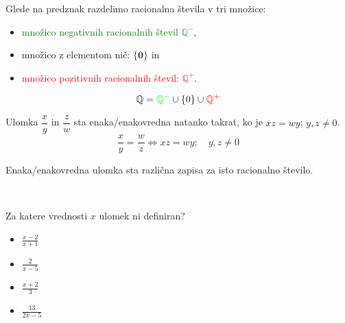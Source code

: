                     
            

            
                Glede na predznak razdelimo racionalna števila v tri množice:
                \begin{itemize}
                    \item \textcolor{green}{množico negativnih racionalnih števil $\mathbf{\mathbb{Q}^-}$},
                    \item množico z elementom nič: $\mathbf{\{0\}}$ in
                    \item \textcolor{red}{množico pozitivnih racionalnih števil: $\mathbf{\mathbb{Q}^+}$}.
                \end{itemize}
                $$ \mathbb{Q}=\textcolor{green}{\mathbb{Q}^-}\cup\{0\}\cup\textcolor{red}{\mathbb{Q}^+} $$
            
            


        

        
            
                Ulomka $\dfrac{x}{y}$ in $\dfrac{z}{w}$ sta enaka/enakovredna natanko takrat, ko je $xz=wy$; $y,z\neq 0$.
                $$\dfrac{x}{y}=\dfrac{w}{z}\Leftrightarrow xz=wy; \quad y,z\neq 0$$
            

            
                Enaka/enakovredna ulomka sta različna zapisa za isto racionalno število.
            
        ~\\




        
            \begin{naloga}
                Za katere vrednosti $x$ ulomek ni definiran?
                \begin{itemize}
                    \item $\frac{x-2}{x+1}$ 
                    \item $\frac{2}{x-5}$ 
                    \item $\frac{x+2}{3}$ 
                    \item $\frac{13}{2x-5}$ 
                \end{itemize}
            \end{naloga}
        

